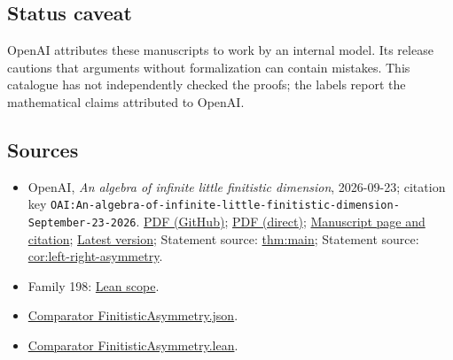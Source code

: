 \documentclass[11pt]{article}
\begin{document}
\subsection{Status caveat}
OpenAI attributes these manuscripts to work by an internal model. Its release cautions that arguments without formalization can contain mistakes. This catalogue has not independently checked the proofs; the labels report the mathematical claims attributed to OpenAI.

\subsection{Sources}
\begin{itemize}
\item OpenAI, \emph{An algebra of infinite little finitistic dimension}, 2026-09-23; citation key \texttt{OAI:An-algebra-of-infinite-little-finitistic-dimension-September-23-2026}. \href{https://github.com/openai/math/blob/adc7f1241b42e322a6451854ab7e4b4c146bf78a/preprints/An-algebra-of-infinite-little-finitistic-dimension-September-23-2026/paper.pdf}{PDF (GitHub)}; \href{https://github.com/openai/math/raw/adc7f1241b42e322a6451854ab7e4b4c146bf78a/preprints/An-algebra-of-infinite-little-finitistic-dimension-September-23-2026/paper.pdf}{PDF (direct)}; \href{https://github.com/openai/math/blob/adc7f1241b42e322a6451854ab7e4b4c146bf78a/preprints/An-algebra-of-infinite-little-finitistic-dimension-September-23-2026/README.md}{Manuscript page and citation}; \href{https://github.com/openai/math/blob/main/preprints/An-algebra-of-infinite-little-finitistic-dimension-September-23-2026/paper.pdf}{Latest version}; Statement source: \href{https://github.com/openai/math/blob/adc7f1241b42e322a6451854ab7e4b4c146bf78a/preprints/An-algebra-of-infinite-little-finitistic-dimension-September-23-2026/build/sections/01-introduction.tex\#L24}{thm:main}; Statement source: \href{https://github.com/openai/math/blob/adc7f1241b42e322a6451854ab7e4b4c146bf78a/preprints/An-algebra-of-infinite-little-finitistic-dimension-September-23-2026/build/sections/01-introduction.tex\#L91}{cor:left-right-asymmetry}.
\item Family 198: \href{https://github.com/openai/math/blob/adc7f1241b42e322a6451854ab7e4b4c146bf78a/lean/docs/198.md}{Lean scope}.
\item \href{https://github.com/openai/math/blob/adc7f1241b42e322a6451854ab7e4b4c146bf78a/lean/ComparatorChallenges/FinitisticAsymmetry.json}{Comparator FinitisticAsymmetry.json}.
\item \href{https://github.com/openai/math/blob/adc7f1241b42e322a6451854ab7e4b4c146bf78a/lean/ComparatorChallenges/FinitisticAsymmetry.lean}{Comparator FinitisticAsymmetry.lean}.

\end{itemize}
\end{document}
